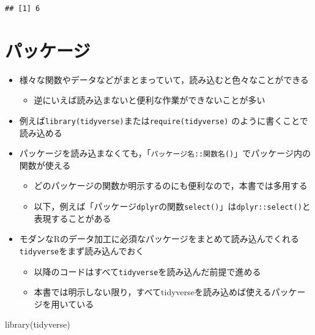 \documentclass[
  xelatex,ja=standard, b5paper]{bxjsbook}
\newenvironment{Shaded}{\begin{snugshade}}{\end{snugshade}}
\newcommand{\FunctionTok}[1]{\textcolor[rgb]{0.00,0.00,0.00}{#1}}
\newcommand{\NormalTok}[1]{#1}
\providecommand{\tightlist}{%
  \setlength{\itemsep}{0pt}\setlength{\parskip}{0pt}}
\begin{document}
\begin{verbatim}
## [1] 6
\end{verbatim}

\hypertarget{p-package}{%
\section{パッケージ}\label{p-package}}

\begin{itemize}
\tightlist
\item
  様々な関数やデータなどがまとまっていて，読み込むと色々なことができる

  \begin{itemize}
  \tightlist
  \item
    逆にいえば読み込まないと便利な作業ができないことが多い
  \end{itemize}
\item
  例えば\texttt{library(tidyverse)}または\texttt{require(tidyverse)} のように書くことで読み込める
\item
  パッケージを読み込まなくても，「\texttt{パッケージ名::関数名()}」でパッケージ内の関数が使える

  \begin{itemize}
  \tightlist
  \item
    どのパッケージの関数か明示するのにも便利なので，本書では多用する
  \item
    以下，例えば「パッケージ\texttt{dplyr}の関数\texttt{select()}」は\texttt{dplyr::select()}と表現することがある
  \end{itemize}
\item
  モダンなRのデータ加工に必須なパッケージをまとめて読み込んでくれる\texttt{tidyverse}をまず読み込んでおく

  \begin{itemize}
  \tightlist
  \item
    以降のコードはすべて\texttt{tidyverse}を読み込んだ前提で進める
  \item
    本書では明示しない限り，すべてtidyverseを読み込めば使えるパッケージを用いている
  \end{itemize}
\end{itemize}

\begin{Shaded}
\begin{Highlighting}[]
\FunctionTok{library}\NormalTok{(tidyverse)}
\end{Highlighting}
\end{Shaded}
\end{document}
